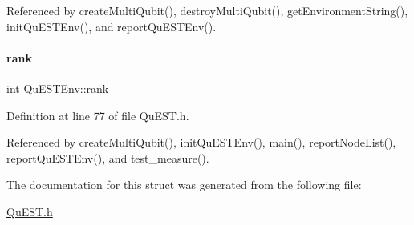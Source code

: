 Referenced by create\+Multi\+Qubit(), destroy\+Multi\+Qubit(), get\+Environment\+String(), init\+Qu\+E\+S\+T\+Env(), and report\+Qu\+E\+S\+T\+Env().

\mbox{\label{structQuESTEnv_aa648bb336cf8598467cb62db00b9cee8}} 
\paragraph{\texorpdfstring{rank}{rank}}
{\footnotesize\ttfamily int Qu\+E\+S\+T\+Env\+::rank}



Definition at line 77 of file Qu\+E\+S\+T.\+h.



Referenced by create\+Multi\+Qubit(), init\+Qu\+E\+S\+T\+Env(), main(), report\+Node\+List(), report\+Qu\+E\+S\+T\+Env(), and test\+\_\+measure().



The documentation for this struct was generated from the following file\+:\begin{DoxyCompactItemize}
\item 
\mbox{\hyperlink{QuEST_8h}{Qu\+E\+S\+T.\+h}}\end{DoxyCompactItemize}
